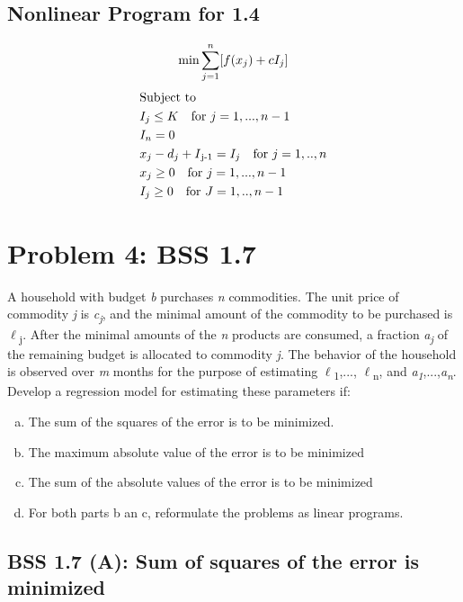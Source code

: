 \documentclass[12pt]{article}
\begin{document}
\subsection{Nonlinear Program for 1.4}
    \begin{equation*}
       \min \sum_{j=1}^{n} [f(x_j) + cI_j]\\
    \end{equation*}
       \begin{align*} 
            &\text{Subject to}\\
            &I_j \leq K \quad \text{for } j=1,...,n-1\\
            &I_n = 0\\
            &x_j - d_j + I\textsubscript{j-1} = I_j \quad \text{for } j = 1,..,n\\
            &x_j \geq 0 \quad \text{for } j=1,...,n-1\\
            &I_j \geq 0 \quad \text{for } J=1,..,n-1\\
        \end{align*}
        
\section{Problem 4: BSS 1.7}
A household with budget \textit{b} purchases \textit{n} commodities. The unit price of commodity \textit{j} is \textit{c\textsubscript{j}}, and the minimal amount of the commodity to be purchased is $\ell$\textsubscript{j}. After the minimal amounts of the \textit{n} products are consumed, a fraction \textit{a\textsubscript{j}} of the remaining budget is allocated to commodity \textit{j}. The behavior of the household is observed over \textit{m} months for the purpose of estimating $\ell$\textsubscript{1},..., $\ell$\textsubscript{n}, and \textit{a\textsubscript{1}},...,\textit{a\textsubscript{n}}. Develop a regression model for estimating these parameters if:
\begin{enumerate}[(a)]
\item The sum of the squares of the error is to be minimized.
\item The maximum absolute value of the error is to be minimized
\item The sum of the absolute values of the error is to be minimized
\item For both parts b an c, reformulate the problems as linear programs.
\end{enumerate}

\subsection{BSS 1.7 (A): Sum of squares of the error is minimized}
\end{document}
